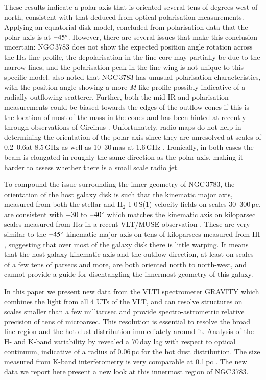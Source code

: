 \documentclass[longauth,]{aa}
\begin{document}
These results indicate a polar axis that is oriented several tens of degrees west of north, consistent with that deduced from optical polarisation measurements.
Applying an equatorial disk model, \cite{smith02,smith04} concluded from polarisation data that the polar axis is at $-45\degree$. 
However, there are several issues that make this conclusion uncertain: NGC\,3783 does not show the expected position angle rotation across the H$\alpha$ line profile, the depolarisation in the line core may partially be due to the narrow lines, and the polarisation peak in the line wing is not unique to this specific model.
\cite{lira20} also noted that NGC\,3783 has unusual polarisation characteristics, with the position angle showing a more {\it M}-like profile possibly indicative of a radially outflowing scatterer. Further, both the mid-IR and polarisation measurements could be biased towards the edges of the outflow cones if this is the location of most of the mass in the cones and has been hinted at recently through observations of Circinus \citep[e.g.][]{Stalevski:2017aa,Stalevski:2019aa}.
Unfortunately, radio maps do not help in determining the orientation of the polar axis since they are unresolved at scales of 0.2--0.6\arcsec at 8.5\,GHz as well as 10--30\,mas at 1.6\,GHz \citep{Schmitt:2001aa,Orienti:2010aa}. Ironically, in both cases the beam is elongated in roughly the same direction as the polar axis, making it harder to assess whether there is a small scale radio jet.

To compound the issue surrounding the inner geometry of NGC\,3783, the orientation of the host galaxy disk is such that the kinematic major axis, measured from both the stellar and H$_2$ 1-0\,S(1) velocity fields on scales 30--300\,pc, are consistent with $-30$ to $-40\degree$ \citep{Davies:2007aa,Hicks:2009aa,Lin:2018aa} which matches the kinematic axis on kiloparsec scales measured from H$\alpha$ in a recent VLT/MUSE observation \citep{den-Brok:2020aa}.
These are very similar to the $-45\degree$ kinematic major axis on tens of kiloparsecs measured from HI \citep{garciabarreto99}, suggesting that over most of the galaxy disk there is little warping.
It means that the host galaxy kinematic axis and the outflow direction, at least on scales of a few tens of parsecs and more, are both oriented north to north-west, and cannot provide a guide for disentangling the innermost geometry of this galaxy.

In this paper we present new data from the VLTI spectrometer GRAVITY \citep{GC2017FL} which combines the light from all 4 UTs of the VLT, and can resolve structures on scales smaller than a few milliarcsec and  provide spectro-astrometric relative precision of tens of microarsec.
This resolution is essential to resolve the broad line region and the hot dust distribution immediately around it.
Analysis of the H- and K-band variability by \cite{lira11} revealed a 70\,day lag with respect to optical continuum, indicative of a radius of 0.06\,pc for the hot dust distribution. 
The size measured from K-band interferometry is very comparable at 0.1\,pc \citep{Weigelt:2012aa,Gravity-Collaboration:2020ac}.
The new data we report here present a new look at this innermost region of NGC\,3783.
\end{document}
